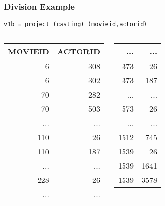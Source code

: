 \documentclass[dvipsnames]{beamer}
\theoremstyle{plain}
\begin{document}
\begin{frame}[fragile]
  \frametitle{Division Example}

  \begin{example}
    \begin{lstlisting}
v1b = project (casting) (movieid,actorid)
    \end{lstlisting}

    \pause
    \begin{columns}[b]
      \begin{tiny}
      \begin{table}
        \begin{tabular}{|r|r|}\hline
MOVIEID & ACTORID\\\hline\hline
      6 &     308\\\hline
      6 &     302\\\hline
     70 &     282\\\hline
     70 &     503\\\hline
    ... &     ...\\\hline
    110 &      26\\\hline
    110 &     187\\\hline
    ... &     ...\\\hline
    228 &      26\\\hline
    ... &     ...\\\hline
        \end{tabular}
      \end{table}
      \end{tiny}

      \begin{tiny}
      \begin{table}
        \begin{tabular}{|r|r|}\hline
    ... &     ...\\\hline
    373 &      26\\\hline
    373 &     187\\\hline
    ... &     ...\\\hline
    573 &      26\\\hline
    ... &     ...\\\hline
   1512 &     745\\\hline
   1539 &      26\\\hline
   1539 &    1641\\\hline
   1539 &    3578\\\hline
        \end{tabular}
      \end{table}
      \end{tiny}
    \end{columns}
  \end{example}
\end{frame}
\end{document}
